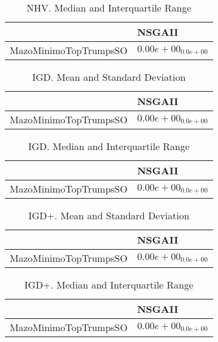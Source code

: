 \documentclass{article}
\begin{document}
\begin{table}
\caption{NHV. Median and Interquartile Range}
\label{table: NHV}
\centering
\begin{scriptsize}
\begin{tabular}{ll}
\hline &  NSGAII\\
\hline 
MazoMinimoTopTrumpsSO & \cellcolor{gray95}$  0.00e+00_{ 0.0e+00}$ \\
\hline
\end{tabular}
\end{scriptsize}
\end{table}

\begin{table}
\caption{IGD. Mean and Standard Deviation}
\label{table: IGD}
\centering
\begin{scriptsize}
\begin{tabular}{ll}
\hline &  NSGAII\\
\hline 
MazoMinimoTopTrumpsSO & \cellcolor{gray95}$  0.00e+00_{ 0.0e+00}$ \\
\hline
\end{tabular}
\end{scriptsize}
\end{table}

\begin{table}
\caption{IGD. Median and Interquartile Range}
\label{table: IGD}
\centering
\begin{scriptsize}
\begin{tabular}{ll}
\hline &  NSGAII\\
\hline 
MazoMinimoTopTrumpsSO & \cellcolor{gray95}$  0.00e+00_{ 0.0e+00}$ \\
\hline
\end{tabular}
\end{scriptsize}
\end{table}

\begin{table}
\caption{IGD+. Mean and Standard Deviation}
\label{table: IGD+}
\centering
\begin{scriptsize}
\begin{tabular}{ll}
\hline &  NSGAII\\
\hline 
MazoMinimoTopTrumpsSO & \cellcolor{gray95}$  0.00e+00_{ 0.0e+00}$ \\
\hline
\end{tabular}
\end{scriptsize}
\end{table}

\begin{table}
\caption{IGD+. Median and Interquartile Range}
\label{table: IGD+}
\centering
\begin{scriptsize}
\begin{tabular}{ll}
\hline &  NSGAII\\
\hline 
MazoMinimoTopTrumpsSO & \cellcolor{gray95}$  0.00e+00_{ 0.0e+00}$ \\
\hline
\end{tabular}
\end{scriptsize}
\end{table}
\end{document}
